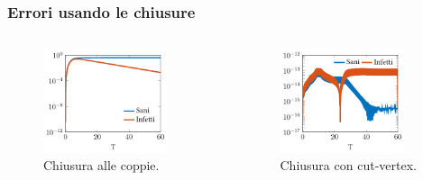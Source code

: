 \documentclass{beamer}
\theoremstyle{definition}
\theoremstyle{plain}
\begin{document}
\begin{frame}
\frametitle{Errori usando le chiusure}

\begin{columns}
\begin{column}{0.5\textwidth} 
 \begin{figure}
\centering
\includegraphics[width=0.85\textwidth]{Figure/figure10}
\caption{Chiusura alle coppie.}
\end{figure}
\end{column}
\begin{column}{0.5\textwidth}
\pause
 \begin{figure}
\centering
\includegraphics[width=0.85\textwidth]{Figure/figure9}
\caption{Chiusura con cut-vertex.}
\end{figure}
\end{column}
\end{columns}
\end{frame}
\end{document}
